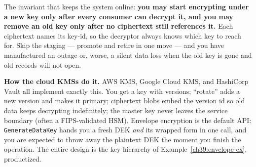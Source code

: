 \begin{center}
\end{center}

The invariant that keeps the system online: \textbf{you may start encrypting under
a new key only after every consumer can decrypt it, and you may remove an old key
only after no ciphertext still references it.} Each ciphertext names its key-id, so
the decryptor always knows which key to reach for. Skip the staging --- promote and
retire in one move --- and you have manufactured an outage or, worse, a silent data
loss when the old key is gone and old records will not open.

\begin{applicationbox}
\textbf{How the cloud KMSs do it.} AWS KMS, Google Cloud KMS, and HashiCorp Vault
all implement exactly this. You get a key with versions; ``rotate'' adds a new
version and makes it primary; ciphertext blobs embed the version id so old data
keeps decrypting indefinitely; the master key never leaves the service boundary
(often a FIPS-validated HSM). Envelope encryption is the default API:
\texttt{GenerateDataKey} hands you a fresh DEK \emph{and} its wrapped form in one
call, and you are expected to throw away the plaintext DEK the moment you finish
the operation. The entire design is the key hierarchy of
Example~\ref{ch39:envelope-ex}, productized.
\end{applicationbox}

